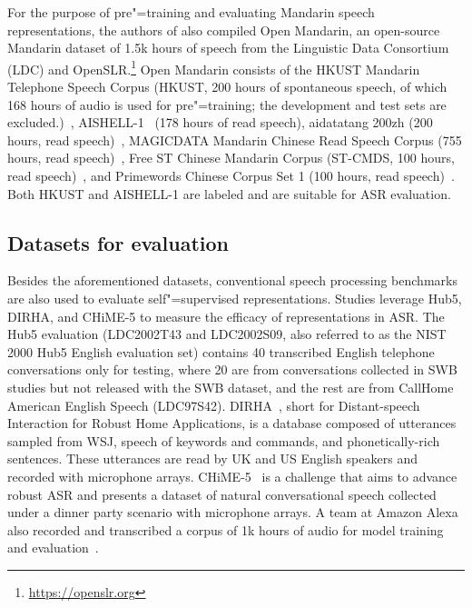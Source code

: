 For the purpose of pre"=training and evaluating Mandarin speech representations,
the authors of \parencite{jiang_improving_2019, jiang_further_2021} also compiled Open Mandarin, 
an open-source Mandarin dataset of 1.5k hours of speech from
the Linguistic Data Consortium (LDC) and
OpenSLR.\footnote{\url{https://openslr.org}} Open Mandarin consists of the HKUST
Mandarin Telephone Speech Corpus (HKUST, 200 hours of spontaneous 
speech, of which
168 hours of audio is used for pre"=training; the development and test sets are
excluded.)~\parencite{liu_hkust_2006}, AISHELL-1~\parencite{bu_aishell1_2017} (178 hours of
read speech),
aidatatang 200zh (200 hours, read speech)~\parencite{beijingdatatangtechnologycoltd_aidatatang_}, MAGICDATA
Mandarin Chinese Read Speech Corpus (755 hours, read speech)~\parencite{magicdatatechnologycoltd_magicdata_2019},
Free ST Chinese Mandarin Corpus (ST-CMDS, 100 hours, read speech)~\parencite{surfingtechcoltd_stcmds_},
and Primewords Chinese Corpus Set 1 (100 hours, read speech)~\parencite{primewordsinformationtechnologycoltd_primewords_2018}. 
Both HKUST and AISHELL-1 are labeled and are suitable for ASR evaluation.


\subsection{Datasets for evaluation}

Besides the aforementioned datasets, conventional speech processing benchmarks
are also used to evaluate self"=supervised representations. Studies leverage Hub5,
DIRHA, and CHiME-5 to measure the efficacy of representations in ASR.
The Hub5 evaluation (LDC2002T43 and LDC2002S09, also referred to as the NIST 2000
Hub5 English evaluation set) contains 40 transcribed English telephone
conversations only for testing, where 20 are from conversations collected in
SWB studies but not released with the SWB dataset, and the rest are from CallHome
American English Speech (LDC97S42). DIRHA~\parencite{ravanelli_dirhaenglish_2015}, short for
Distant-speech Interaction for Robust Home Applications, is a database composed
of utterances sampled from WSJ, speech of keywords and commands, and
phonetically-rich sentences. These utterances are read by UK and US English
speakers and recorded with microphone arrays. CHiME-5~\parencite{barker_fifth_2018} is
a challenge that aims to advance robust ASR and presents a dataset of natural
conversational speech collected under a dinner party scenario with microphone
arrays. A team at Amazon Alexa also recorded and transcribed a corpus of 1k
hours of audio for model training and evaluation~\parencite{sadhu_wav2vecc_2021}.

